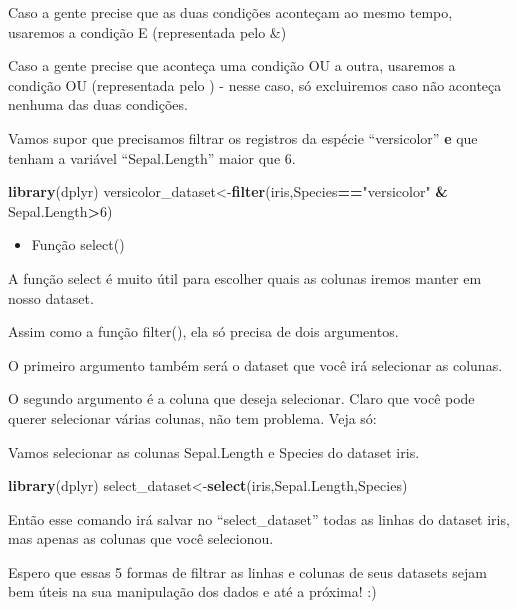 \documentclass[
]{book}
\newenvironment{Shaded}{\begin{snugshade}}{\end{snugshade}}
\newcommand{\DecValTok}[1]{\textcolor[rgb]{0.00,0.00,0.81}{#1}}
\newcommand{\KeywordTok}[1]{\textcolor[rgb]{0.13,0.29,0.53}{\textbf{#1}}}
\newcommand{\NormalTok}[1]{#1}
\newcommand{\OperatorTok}[1]{\textcolor[rgb]{0.81,0.36,0.00}{\textbf{#1}}}
\newcommand{\StringTok}[1]{\textcolor[rgb]{0.31,0.60,0.02}{#1}}
\providecommand{\tightlist}{%
  \setlength{\itemsep}{0pt}\setlength{\parskip}{0pt}}
\begin{document}
Caso a gente precise que as duas condições aconteçam ao mesmo tempo,
usaremos a condição E (representada pelo \&)

Caso a gente precise que aconteça uma condição OU a outra, usaremos a
condição OU (representada pelo \textbar) - nesse caso, só excluiremos
caso não aconteça nenhuma das duas condições.

Vamos supor que precisamos filtrar os registros da espécie
``versicolor'' \textbf{e} que tenham a variável ``Sepal.Length'' maior
que 6.

\begin{Shaded}
\begin{Highlighting}[]
\KeywordTok{library}\NormalTok{(dplyr)}
\NormalTok{versicolor_dataset<-}\KeywordTok{filter}\NormalTok{(iris,Species}\OperatorTok{==}\StringTok{"versicolor"} \OperatorTok{&}\StringTok{ }\NormalTok{Sepal.Length}\OperatorTok{>}\DecValTok{6}\NormalTok{)}
\end{Highlighting}
\end{Shaded}

\begin{itemize}
\tightlist
\item
  Função select()
\end{itemize}

A função select é muito útil para escolher quais as colunas iremos
manter em nosso dataset.

Assim como a função filter(), ela só precisa de dois argumentos.

O primeiro argumento também será o dataset que você irá selecionar as
colunas.

O segundo argumento é a coluna que deseja selecionar. Claro que você
pode querer selecionar várias colunas, não tem problema. Veja só:

Vamos selecionar as colunas Sepal.Length e Species do dataset iris.

\begin{Shaded}
\begin{Highlighting}[]
\KeywordTok{library}\NormalTok{(dplyr)}
\NormalTok{select_dataset<-}\KeywordTok{select}\NormalTok{(iris,Sepal.Length,Species)}
\end{Highlighting}
\end{Shaded}

Então esse comando irá salvar no ``select\_dataset'' todas as linhas do
dataset iris, mas apenas as colunas que você selecionou.

Espero que essas 5 formas de filtrar as linhas e colunas de seus
datasets sejam bem úteis na sua manipulação dos dados e até a próxima!
:)
\end{document}

